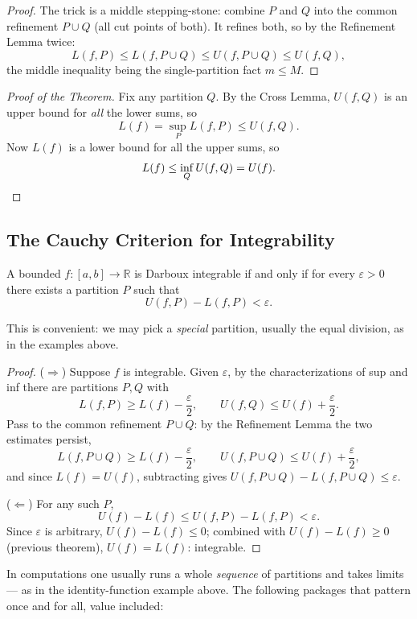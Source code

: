 \documentclass[11pt]{report}
\begin{document}
\begin{proof}
The trick is a middle stepping-stone: combine $P$ and $Q$ into the common refinement $P \cup Q$ (all cut points of both). It refines both, so by the Refinement Lemma twice:
\[
L(f,P) \leq L(f, P\cup Q) \leq U(f, P \cup Q) \leq U(f, Q),
\]
the middle inequality being the single-partition fact $m \leq M$.
\end{proof}

\begin{proof}[Proof of the Theorem]
Fix any partition $Q$. By the Cross Lemma, $U(f,Q)$ is an upper bound for \emph{all} the lower sums, so
\[
L(f) = \sup_P L(f,P) \leq U(f, Q).
\]
Now $L(f)$ is a lower bound for all the upper sums, so
\[
L(f) \leq \inf_Q U(f,Q) = U(f). \qedhere
\]
\end{proof}

\subsection{The Cauchy Criterion for Integrability}

\begin{thmbox}
A bounded $f: [a,b] \to \mathbb{R}$ is Darboux integrable if and only if for every $\varepsilon > 0$ there exists a partition $P$ such that
\[
U(f, P) - L(f, P) < \varepsilon.
\]
\end{thmbox}

This is convenient: we may pick a \emph{special} partition, usually the equal division, as in the examples above.

\begin{proof}
($\Rightarrow$) Suppose $f$ is integrable. Given $\varepsilon$, by the characterizations of sup and inf there are partitions $P, Q$ with
\[
L(f, P) \geq L(f) - \frac\varepsilon2, \qquad U(f, Q) \leq U(f) + \frac\varepsilon2.
\]
Pass to the common refinement $P \cup Q$: by the Refinement Lemma the two estimates persist,
\[
L(f, P\cup Q) \geq L(f) - \frac\varepsilon2, \qquad U(f, P\cup Q) \leq U(f) + \frac\varepsilon2,
\]
and since $L(f) = U(f)$, subtracting gives $U(f, P\cup Q) - L(f, P\cup Q) \leq \varepsilon$.

($\Leftarrow$) For any such $P$,
\[
U(f) - L(f) \leq U(f,P) - L(f,P) < \varepsilon.
\]
Since $\varepsilon$ is arbitrary, $U(f) - L(f) \leq 0$; combined with $U(f) - L(f) \geq 0$ (previous theorem), $U(f) = L(f)$: integrable.
\end{proof}

In computations one usually runs a whole \emph{sequence} of partitions and takes limits --- as in the identity-function example above. The following packages that pattern once and for all, value included:
\end{document}
